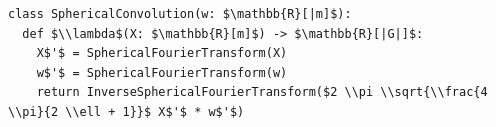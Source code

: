 \documentclass[border=10pt]{standalone}
\begin{document}
\begin{lstlisting}
class SphericalConvolution(w: $\mathbb{R}[|m]$):
  def $\\lambda$(X: $\mathbb{R}[m]$) -> $\mathbb{R}[|G|]$:
    X$'$ = SphericalFourierTransform(X)
    w$'$ = SphericalFourierTransform(w)
    return InverseSphericalFourierTransform($2 \\pi \\sqrt{\\frac{4 \\pi}{2 \\ell + 1}}$ X$'$ * w$'$)
\end{lstlisting}
\end{document}
